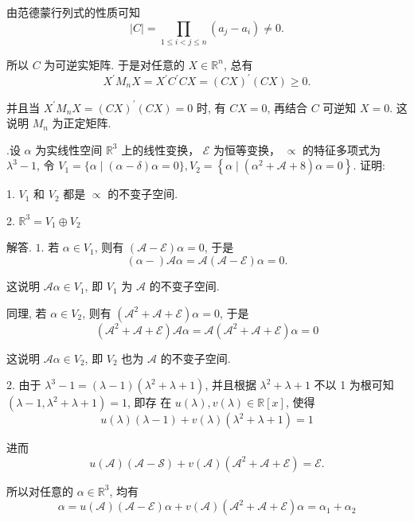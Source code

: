 \documentclass{article}
\begin{document}
由范德蒙行列式的性质可知
$$
    |C|=\prod_{1 \leq i<j \leq n}\left(a_{j}-a_{i}\right) \neq 0 .
$$

所以 $C$ 为可逆实矩阵. 于是对任意的 $X \in \mathbb{R}^{n}$, 总有
$$
    X^{\prime} M_{n} X=X^{\prime} C^{\prime} C X=(C X)^{\prime}(C X) \geq 0 .
$$

并且当 $X^{\prime} M_{n} X=(C X)^{\prime}(C X)=0$ 时, 有 $C X=0$, 再结合 $C$ 可逆知 $X=0 .$ 这说明 $M_{n}$ 为正定矩阵.

\vspace{1ex}
{.}设 $\alpha$ 为实线性空间 $\mathbb{R}^{3}$ 上的线性变换， $\mathscr{E}$ 为恒等变换， $\propto$ 的特征多项式为 $\lambda^{3}-1$, 令 $V_{1}=\{\alpha \mid(\mathscr{\alpha}-\mathscr{\delta}) \alpha=0\}, V_{2}=\left\{\alpha \mid\left(\mathscr{\alpha}^{2}+\mathscr{A}+8\right) \alpha=0\right\} .$ 证明:

1. $V_{1}$ 和 $V_{2}$ 都是 $\propto$ 的不变子空间.

2. $\mathbb{R}^{3}=V_{1} \oplus V_{2}$

解答. $1 .$ 若 $\alpha \in V_{1}$, 则有 $(\mathscr{A}-\mathscr{E}) \alpha=0$, 于是
$$
    (\alpha-\mathscr{}) \mathscr{A} \alpha=\mathscr{A}(\mathscr{A}-\mathscr{E}) \alpha=0 .
$$

这说明 $\mathscr{A} \alpha \in V_{1}$, 即 $V_{1}$ 为 $\mathscr{A} \mathscr{\text { 的不变子空间. }}$

同理, 若 $\alpha \in V_{2}$, 则有 $\left(\mathscr{A}^{2}+\mathscr{A}+\mathscr{E}\right) \alpha=0$, 于是
\begin{equation*}
    \left(\mathscr{A}^{2}+\mathscr{A}+\mathscr{E}\right)\mathscr{A} \alpha=\mathscr{A}\left(\mathscr{A}^{2}+\mathscr{A}+\mathscr{E}\right) \alpha=0
\end{equation*}

这说明 $\mathscr{A} \alpha \in V_{2}$, 即 $V_{2}$ 也为 $\mathscr{A}$ 的不变子空间.

2. 由于 $\lambda^{3}-1=(\lambda-1)\left(\lambda^{2}+\lambda+1\right)$, 并且根据 $\lambda^{2}+\lambda+1$ 不以 1 为根可知 $\left(\lambda-1, \lambda^{2}+\lambda+1\right)=1$, 即存
在 $u(\lambda), v(\lambda) \in \mathbb{R}[x]$, 使得
$$
    u(\lambda)(\lambda-1)+v(\lambda)\left(\lambda^{2}+\lambda+1\right)=1
$$

进而
$$
    u(\mathscr{A})(\mathscr{A}-\mathscr{S})+v(\mathscr{A})\left(\mathscr{A}^{2}+\mathscr{A}+\mathscr{E}\right)=\mathcal{E} .
$$

所以对任意的 $\alpha \in \mathbb{R}^{3}$, 均有
\begin{equation}
    \alpha=u(\mathscr{A})(\mathscr{A}-\mathscr{E}) \alpha+v(\mathscr{A})\left(\mathscr{A}^{2}+\mathscr{A}+\mathscr{E}\right) \alpha=\alpha_{1}+\alpha_{2}
    \tag{3}
\end{equation}
\end{document}
